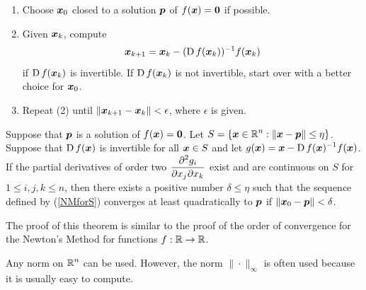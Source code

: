 \begin{algo}
\begin{enumerate}
\item Choose $\VEC{x}_0$ closed to a solution $\VEC{p}$ of
$f(\VEC{x}) = \VEC{0}$ if possible.
\item Given $\VEC{x}_k$, compute
\begin{equation} \label{NMforS}
\VEC{x}_{k+1}=\VEC{x}_k- (\diff f(\VEC{x}_k))^{-1} f(\VEC{x}_k)
\end{equation}
if $\diff f(\VEC{x}_k)$ is invertible.  If $\diff f(\VEC{x}_k)$ is not
invertible, start over with a better choice for $\VEC{x}_0$.
\item  Repeat (2) until $\| \VEC{x}_{k+1} - \VEC{x}_k \| < \epsilon$,
where $\epsilon$ is given.
\end{enumerate}
\end{algo}

\begin{theorem}
Suppose that $\VEC{p}$ is a solution of $f(\VEC{x}) = \VEC{0}$.
Let $\DS S=\{ \VEC{x} \in \RR^n : \| \VEC{x} - \VEC{p} \|
\leq \eta\}$.
Suppose that $\diff f(\VEC{x})$ is invertible for all $\VEC{x} \in S$
and let
$\DS g(\VEC{x}) = \VEC{x}- \diff f(\VEC{x})^{-1} f(\VEC{x})$.
If the partial derivatives of order two
$\DS \pdydxnm{g_i}{x_j}{x_k}{2}{}{}$ exist and are
continuous on $S$ for $1 \leq i,j,k \leq n$, then
there exists a positive number $\delta \leq \eta$ such that the
sequence defined by (\ref{NMforS}) converges at least quadratically to
$\VEC{p}$ if $\| \VEC{x}_0 - \VEC{p} \| < \delta$.
\end{theorem}

The proof of this theorem is similar to the proof of the order of
convergence for the Newton's Method for functions $f:\RR \to \RR$.

\begin{rmk}
Any norm on $\DS \RR^n$ can be used.  However, the norm
$\|\cdot\|_\infty$
is often used because it is usually easy to compute.
\end{rmk}

